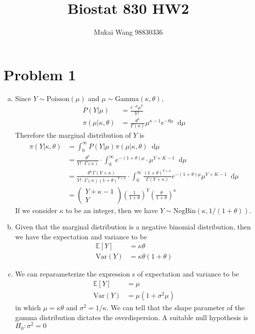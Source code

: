 \documentclass[12pt]{article}
\title{Biostat 830 HW2}
\date{}
\author{Mukai Wang 98830336}
\newcommand*\diff{\mathop{}\!\mathrm{d}}
\begin{document}
\maketitle

\section*{Problem 1}

\begin{enumerate}[(a)]
	\item Since $Y\sim \text{Poisson}(\mu)$ and $\mu \sim \text{Gamma}(\kappa, \theta)$, 
	\begin{align*}
	P\left(\left.Y \right\vert\mu \right)& = \frac{e^{-\mu} \mu^{Y}}{Y!}\\
	\pi\left(\left.\mu \right\vert \kappa, \theta\right) &= \frac{\theta^{\kappa}}{\Gamma(\kappa)}\mu^{\kappa - 1}e^{-\theta\mu}\diff \mu 
	\end{align*}
	Therefore the marginal distribution of $Y$ is
	\begin{align*}
		\pi\left(\left.Y\right\vert\kappa, \theta \right)&= \int_{0}^{\infty} P\left(\left.Y \right\vert\mu \right) \pi\left(\left.\mu \right\vert \kappa, \theta\right)\diff \mu\\
		&=\frac{\theta^{\kappa}}{Y!\cdot \Gamma(\kappa)}\cdot \int_{0}^{\infty}e^{-(1+\theta)\mu} \cdot \mu^{Y+K-1}\diff \mu \\
		&=\frac{\theta^{\kappa} \Gamma(Y+\kappa)}{Y! \cdot \Gamma(\kappa) \left(1+\theta\right)^{Y+\kappa} }\cdot \int_{0}^{\infty} \frac{(1+\theta)^{Y+\kappa}}{\Gamma(Y+\kappa)}e^{-(1+\theta)\mu}\mu^{Y+K-1}\diff \mu\\
		&=\begin{pmatrix}Y+\kappa - 1 \\ Y\end{pmatrix}\left(\frac{1}{1+\theta}\right)^{Y}\left(\frac{\theta}{1+\theta}\right)^{\kappa}
	\end{align*}
	If we consider $\kappa$ to be an integer, then we have $Y \sim \text{NegBin}(\kappa, 1/(1+\theta))$.
	\item Given that the marginal distribution is a negative binomial distribution, then we have the expectation and variance to be
	\begin{align*}
		\mathbb{E}[Y] &= \kappa\theta\\
		\text{Var}(Y) &= \kappa\theta(1+\theta)
	\end{align*}
	\item We can reparameterize the expression s of expectation and variance to be
	\begin{align*}
		\mathbb{E}[Y] &= \mu \\
		\text{Var}(Y) &= \mu(1+\sigma^2 \mu)
	\end{align*}
	in which $\mu = \kappa\theta$ and $\sigma^2 = 1/\kappa$. We can tell that the shape parameter of the gamma distribution dictates the overdispersion. A suitable null hypothesis is $H_{0} : \sigma^2 = 0$
\end{enumerate}
 
\end{document}
